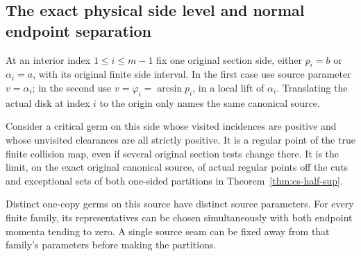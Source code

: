 \subsection{The exact physical side level and normal endpoint separation}

At an interior index $1\le i\le m-1$ fix one original section
side, either $p_i=b$ or $\alpha_i=a$, with its original finite
side interval. In the first case use source parameter
$v=\alpha_i$; in the second use
$v=\varphi_i=\arcsin p_i$, in a local lift of $\alpha_i$.
Translating the actual disk at index $i$ to the origin only names
the same canonical source.

\begin{lemma}
\label{lem:scf-representatives}
Consider a critical germ on this side whose visited incidences
are positive and whose unvisited clearances are all strictly positive.
It is a regular point of the true finite collision map, even if
several original section tests change there. It is the limit, on
the exact original canonical source, of actual regular points off
the cuts and exceptional sets of both one-sided partitions in
Theorem~\ref{thm:cs-half-sup}.

Distinct one-copy germs on this source have distinct source
parameters. For every finite family, its representatives can be
chosen simultaneously with both endpoint momenta tending to zero.
A single source seam can be fixed away from that family's
parameters before making the partitions.
\end{lemma}
